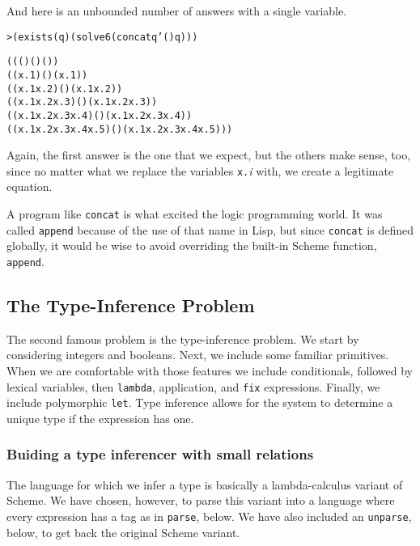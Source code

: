 And here is an unbounded number of answers with a single variable.

\begin{alltt}
> (exists (q) (solve 6 (concat q '() q)))

((() () ())
((x.1) () (x.1))
((x.1 x.2) () (x.1 x.2))
((x.1 x.2 x.3) () (x.1 x.2 x.3))
((x.1 x.2 x.3 x.4) () (x.1 x.2 x.3 x.4))
((x.1 x.2 x.3 x.4 x.5) () (x.1 x.2 x.3 x.4 x.5)))
\end{alltt}

\noindent
Again, the first answer is the one that we expect, but
the others make sense, too, since no matter what we replace
the variables \texttt{x.}\emph{i} with, we create a
legitimate equation.

A program like \texttt{concat} is what excited the
logic programming world.  It was called \texttt{append}
because of the use of that name in Lisp, but since 
\texttt{concat} is defined globally, it would be wise to
avoid overriding the built-in Scheme function, \texttt{append}.

\subsection{The Type-Inference Problem}

The second famous problem is the type-inference problem.  We start by
considering integers and booleans.  Next, we include some familiar
primitives.  When we are comfortable with those features we include
conditionals, followed by lexical variables, then \texttt{lambda},
application, and \texttt{fix} expressions. Finally, we include
polymorphic \texttt{let}.  Type inference allows for the system to
determine a unique type if the expression has one. 

\subsubsection{Buiding a type inferencer with small relations}

The language for which we infer a type is basically a lambda-calculus
variant of Scheme.  We have chosen, however, to parse this variant
into a language where every expression has a tag as in \texttt{parse},
below.  We have also included an \texttt{unparse}, below, to get back
the original Scheme variant.


